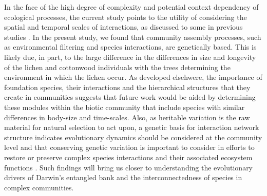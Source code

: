 \documentclass[11pt,twocolumn,twoside,lineno]{pnas-new}
\begin{document}
In the face of the high degree of complexity and potential context
dependency of ecological processes, the current study points to the
utility of considering the spatial and temporal scales of
interactions, as discussed to some in previous studies
\cite{Bangert2006, Zook2010, Zytynska2012}. In the present study, we
found that community assembly processes, such as environmental
filtering and species interactions, are genetically based. This is
likely due, in part, to the large difference in the differences in
size and longevity of the lichen and cottonwood individuals with the
trees determining the environment in which the lichen occur. As
developed elsehwere, the importance of foundation species, their
interactions and the hierarchical structures that they create in
communities \cite{Ellison2005, Whitham2008, Angelini2011} suggests
that future work would be aided by determining these modules within
the biotic community that include species with similar differences in
body-size and time-scales. Also, as heritable variation is the raw
material for natural selection to act upon, a genetic basis for
interaction network structure indicates evolutionary dynamics should
be considered at the community level and that conserving genetic
variation is important to consider in efforts to restore or preserve
complex species interactions and their associated ecosystem functions
\cite{Evans2013}. Such findings will bring us closer to understanding
the evolutionary drivers of Darwin's entangled bank and the
interconnectedness of species in complex communities.





\end{document}

